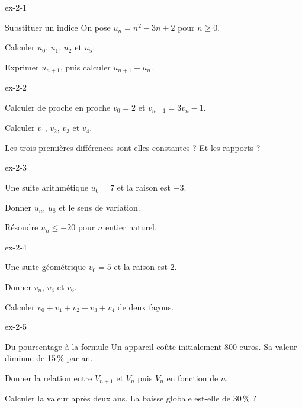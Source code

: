 \begin{blocLivre}{ex-2-1}
\begin{exercice}[1]{Substituer un indice}
On pose $u_n=n^2-3n+2$ pour $n\geq0$.
\begin{questions}\item Calculer $u_0$, $u_1$, $u_2$ et $u_5$.
\item Exprimer $u_{n+1}$, puis calculer $u_{n+1}-u_n$.
\end{questions}
\end{exercice}
\end{blocLivre}
\begin{blocLivre}{ex-2-2}
\begin{exercice}[1]{Calculer de proche en proche}
$v_0=2$ et $v_{n+1}=3v_n-1$.
\begin{questions}\item Calculer $v_1$, $v_2$, $v_3$ et $v_4$.
\item Les trois premières différences sont-elles constantes ? Et les rapports ?
\end{questions}
\end{exercice}
\end{blocLivre}
\begin{blocLivre}{ex-2-3}
\begin{exercice}[1]{Une suite arithmétique}
$u_0=7$ et la raison est $-3$.
\begin{questions}\item Donner $u_n$, $u_8$ et le sens de variation.
\item Résoudre $u_n\leq-20$ pour $n$ entier naturel.
\end{questions}
\end{exercice}
\end{blocLivre}
\begin{blocLivre}{ex-2-4}
\begin{exercice}[1]{Une suite géométrique}
$v_0=5$ et la raison est 2.
\begin{questions}\item Donner $v_n$, $v_4$ et $v_6$.
\item Calculer $v_0+v_1+v_2+v_3+v_4$ de deux façons.
\end{questions}
\end{exercice}
\end{blocLivre}
\begin{blocLivre}{ex-2-5}
\begin{exercice}[1]{Du pourcentage à la formule}
Un appareil coûte initialement 800 euros. Sa valeur diminue de 15\,\% par an.
\begin{questions}\item Donner la relation entre $V_{n+1}$ et $V_n$ puis $V_n$ en fonction de $n$.
\item Calculer la valeur après deux ans. La baisse globale est-elle de 30\,\% ?
\end{questions}
\end{exercice}
\end{blocLivre}
